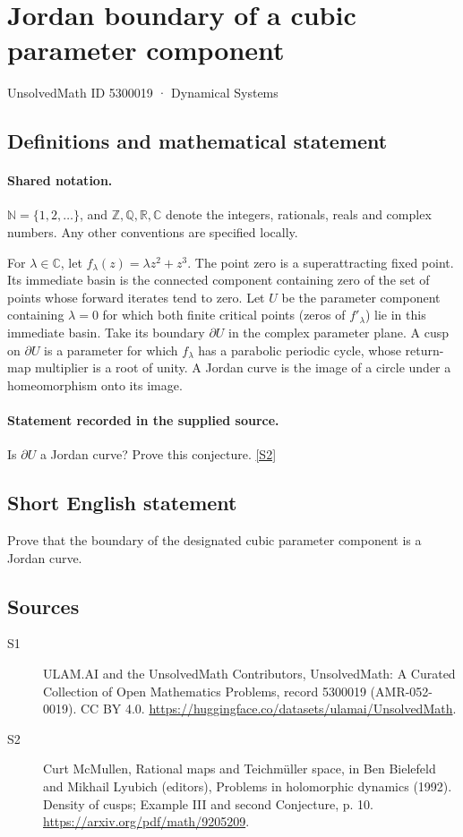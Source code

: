 \documentclass[11pt]{article}
\newcommand{\sref}[2]{\hyperlink{source:#1:#2}{[S#2]}}
\begin{document}
\setcounter{section}{5300018}
\section{Jordan boundary of a cubic parameter component}\label{5300019}
{\small\sffamily UnsolvedMath ID 5300019 · Dynamical Systems}
\subsection{Definitions and mathematical statement}

\paragraph{Shared notation.}$\mathbb N=\{1,2,\ldots\}$, and $\mathbb Z,\mathbb Q,\mathbb R,\mathbb C$ denote the integers, rationals, reals and complex numbers. Any other conventions are specified locally.


For $\lambda\in\mathbb C$, let $f_\lambda(z)=\lambda z^2+z^3$. The point zero is a superattracting fixed point. Its immediate basin is the connected component containing zero of the set of points whose forward iterates tend to zero. Let $U$ be the parameter component containing $\lambda=0$ for which both finite critical points (zeros of $f'_\lambda$) lie in this immediate basin. Take its boundary $\partial U$ in the complex parameter plane. A cusp on $\partial U$ is a parameter for which $f_\lambda$ has a parabolic periodic cycle, whose return-map multiplier is a root of unity. A Jordan curve is the image of a circle under a homeomorphism onto its image.
\paragraph{Statement recorded in the supplied source.}
Is $\partial U$ a Jordan curve? Prove this conjecture. \sref{5300019}{2}
\subsection{Short English statement}
Prove that the boundary of the designated cubic parameter component is a Jordan curve.
\subsection{Sources}
\begin{description}
\item[\hypertarget{source:5300019:1}{S1}] ULAM.AI and the UnsolvedMath Contributors, UnsolvedMath: A Curated Collection of Open Mathematics Problems, record 5300019 (AMR-052-0019). CC BY 4.0. \url{https://huggingface.co/datasets/ulamai/UnsolvedMath}.
\item[\hypertarget{source:5300019:2}{S2}] Curt McMullen, Rational maps and Teichmüller space, in Ben Bielefeld and Mikhail Lyubich (editors), Problems in holomorphic dynamics (1992). Density of cusps; Example III and second Conjecture, p. 10. \url{https://arxiv.org/pdf/math/9205209}.
\end{description}
\label{end:5300019}
\end{document}
